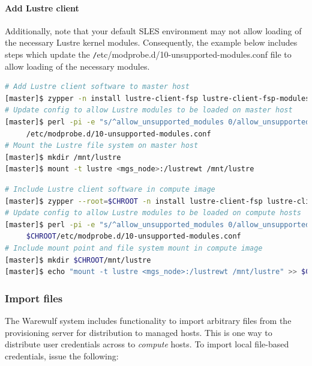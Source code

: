 \documentclass[letterpaper]{article}
\begin{document}
\paragraph{Add Lustre client} 


 Additionally, note that your default SLES environment
  may not allow loading of the necessary Lustre kernel modules. Consequently,
  the example below includes steps which update the {\texttt
    /etc/modprobe.d/10-unsupported-modules.conf} file to allow loading of the necessary
  modules.

\begin{lstlisting}[language=bash,keywords={},upquote=true]
# Add Lustre client software to master host
[master]$ zypper -n install lustre-client-fsp lustre-client-fsp-modules
# Update config to allow Lustre modules to be loaded on master host
[master]$ perl -pi -e "s/^allow_unsupported_modules 0/allow_unsupported_modules 1/" \
     /etc/modprobe.d/10-unsupported-modules.conf
# Mount the Lustre file system on master host
[master]$ mkdir /mnt/lustre
[master]$ mount -t lustre <mgs_node>:/lustrewt /mnt/lustre
\end{lstlisting}

\begin{lstlisting}[language=bash,keywords={},upquote=true]
# Include Lustre client software in compute image
[master]$ zypper --root=$CHROOT -n install lustre-client-fsp lustre-client-fsp-modules
# Update config to allow Lustre modules to be loaded on compute hosts
[master]$ perl -pi -e "s/^allow_unsupported_modules 0/allow_unsupported_modules 1/" \
     $CHROOT/etc/modprobe.d/10-unsupported-modules.conf
# Include mount point and file system mount in compute image
[master]$ mkdir $CHROOT/mnt/lustre
[master]$ echo "mount -t lustre <mgs_node>:/lustrewt /mnt/lustre" >> $CHROOT/etc/fstab
\end{lstlisting}

\subsubsection{Import files} \label{sec:file_import}

The Warewulf system includes functionality to import arbitrary files from the
provisioning server for distribution to managed hosts. This is one way
to distribute user credentials across to {\em compute} hosts. To
import local file-based credentials, issue the following:
\end{document}
